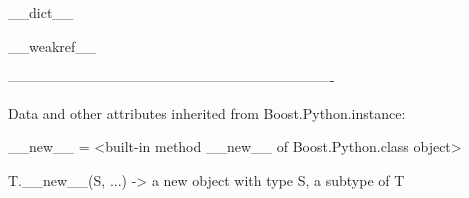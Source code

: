 \documentclass[letterpaper,10pt,english]{sphinxmanual}
\begin{document}
\begin{description}
\begin{description}
\begin{DUlineblock}{0em}
\item[] 
\item[] \_\_dict\_\_
\item[] 
\item[] \_\_weakref\_\_
\item[] 
\item[] ----------------------------------------------------------------------
\item[] Data and other attributes inherited from Boost.Python.instance:
\item[] 
\item[] \_\_new\_\_ = \textless{}built-in method \_\_new\_\_ of Boost.Python.class object\textgreater{}
\item[]
\begin{DUlineblock}{\DUlineblockindent}
\item[] T.\_\_new\_\_(S, ...) -\textgreater{} a new object with type S, a subtype of T
\end{DUlineblock}
\end{DUlineblock}


\end{description}
\end{description}
\end{document}
